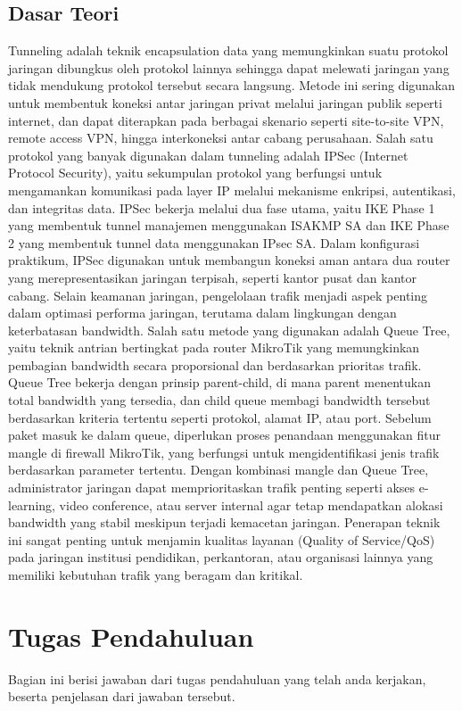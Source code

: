 \subsection{Dasar Teori}
Tunneling adalah teknik encapsulation data yang memungkinkan suatu protokol jaringan dibungkus oleh protokol lainnya sehingga dapat melewati jaringan yang tidak mendukung protokol tersebut secara langsung. Metode ini sering digunakan untuk membentuk koneksi antar jaringan privat melalui jaringan publik seperti internet, dan dapat diterapkan pada berbagai skenario seperti site-to-site VPN, remote access VPN, hingga interkoneksi antar cabang perusahaan. Salah satu protokol yang banyak digunakan dalam tunneling adalah IPSec (Internet Protocol Security), yaitu sekumpulan protokol yang berfungsi untuk mengamankan komunikasi pada layer IP melalui mekanisme enkripsi, autentikasi, dan integritas data. IPSec bekerja melalui dua fase utama, yaitu IKE Phase 1 yang membentuk tunnel manajemen menggunakan ISAKMP SA dan IKE Phase 2 yang membentuk tunnel data menggunakan IPsec SA. Dalam konfigurasi praktikum, IPSec digunakan untuk membangun koneksi aman antara dua router yang merepresentasikan jaringan terpisah, seperti kantor pusat dan kantor cabang. Selain keamanan jaringan, pengelolaan trafik menjadi aspek penting dalam optimasi performa jaringan, terutama dalam lingkungan dengan keterbatasan bandwidth. Salah satu metode yang digunakan adalah Queue Tree, yaitu teknik antrian bertingkat pada router MikroTik yang memungkinkan pembagian bandwidth secara proporsional dan berdasarkan prioritas trafik. Queue Tree bekerja dengan prinsip parent-child, di mana parent menentukan total bandwidth yang tersedia, dan child queue membagi bandwidth tersebut berdasarkan kriteria tertentu seperti protokol, alamat IP, atau port. Sebelum paket masuk ke dalam queue, diperlukan proses penandaan menggunakan fitur mangle di firewall MikroTik, yang berfungsi untuk mengidentifikasi jenis trafik berdasarkan parameter tertentu. Dengan kombinasi mangle dan Queue Tree, administrator jaringan dapat memprioritaskan trafik penting seperti akses e-learning, video conference, atau server internal agar tetap mendapatkan alokasi bandwidth yang stabil meskipun terjadi kemacetan jaringan. Penerapan teknik ini sangat penting untuk menjamin kualitas layanan (Quality of Service/QoS) pada jaringan institusi pendidikan, perkantoran, atau organisasi lainnya yang memiliki kebutuhan trafik yang beragam dan kritikal.

\section{Tugas Pendahuluan}
Bagian ini berisi jawaban dari tugas pendahuluan yang telah anda kerjakan, beserta penjelasan dari jawaban tersebut.

